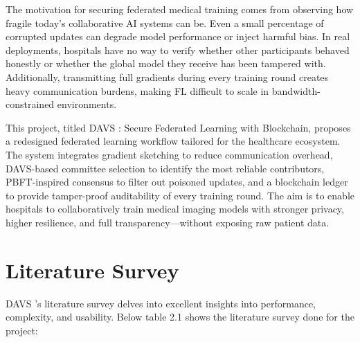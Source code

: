 \documentclass[12pt,a4paper]{article}
\begin{document}
The motivation for securing federated medical training comes from observing how fragile today's collaborative AI systems can be. Even a small percentage of corrupted updates can degrade model performance or inject harmful bias. In real deployments, hospitals have no way to verify whether other participants behaved honestly or whether the global model they receive has been tampered with. Additionally, transmitting full gradients during every training round creates heavy communication burdens, making FL difficult to scale in bandwidth-constrained environments.

This project, titled DAVS : Secure Federated Learning with Blockchain, proposes a redesigned federated learning workflow tailored for the healthcare ecosystem. The system integrates gradient sketching to reduce communication overhead, DAVS-based committee selection to identify the most reliable contributors, PBFT-inspired consensus to filter out poisoned updates, and a blockchain ledger to provide tamper-proof auditability of every training round. The aim is to enable hospitals to collaboratively train medical imaging models with stronger privacy, higher resilience, and full transparency---without exposing raw patient data.

\section{Literature Survey}
DAVS 's literature survey delves into excellent insights into performance, complexity, and usability. Below table 2.1 shows the literature survey done for the project:
\end{document}

